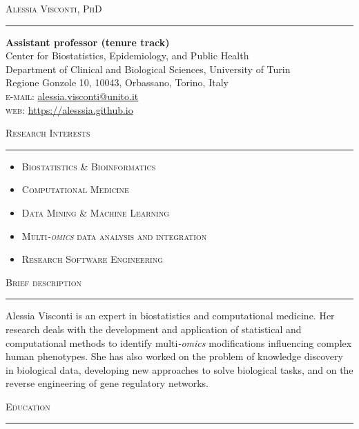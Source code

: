 \documentclass[a4paper,10pt]{article}
\newcommand{\bigtitle}[1]{
	{\begin{center} 
		\huge \textsc{#1}\\[0.7ex]
		\hrule
	\end{center}}
}
\newcommand{\mediumtitle}[1]{
	\vspace{0.2cm}
	{\noindent
	\Large \textsc{#1}\\[-2ex]
	\hrule
	\vspace{0.2cm}}
}
\newcommand{\minusitem}{\item[-]}
\begin{document}
\begin{center}
\bigtitle{Alessia Visconti, PhD}
\end{center}


\textbf{Assistant professor (tenure track)}\\
Center for Biostatistics, Epidemiology, and Public Health\\
Department of Clinical and Biological Sciences, University of Turin\\
Regione Gonzole 10, 10043, Orbassano, Torino, Italy\\


\textsc{e-mail:} \href{mailto:alessia.visconti@unito.it}{alessia.visconti@unito.it}\\
\textsc{web:} \url{https://alesssia.github.io}

\bigskip

\mediumtitle{Research Interests}
\begin{itemize}[itemsep=-0.5ex]
	\minusitem  \textsc{Biostatistics \& Bioinformatics}
 	\minusitem  \textsc{Computational Medicine}
 	\minusitem  \textsc{Data Mining \& Machine Learning}
	\minusitem  \textsc{Multi\emph{-omics} data analysis and integration}
	\minusitem  \textsc{Research Software Engineering}
\end{itemize}

\mediumtitle{Brief description}

Alessia Visconti is an expert in biostatistics and computational medicine. Her research deals with the development and application of statistical and computational methods to identify multi\emph{-omics} modifications influencing complex human phenotypes. 
She has also worked on the problem of knowledge discovery in biological data, developing new approaches to solve biological tasks, and on the reverse engineering of gene regulatory networks.

\bigskip



\mediumtitle{Education}
\end{document}
